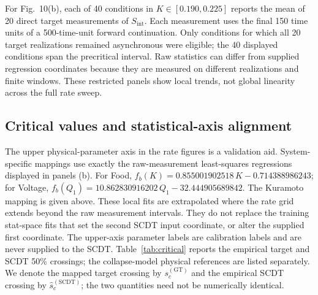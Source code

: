 \documentclass[10pt,a4paper]{article}
\begin{document}
For Fig.~10(b), each of 40 conditions in $K\in[0.190,0.225]$ reports the mean
of 20 direct target measurements of $S_{\mathrm{int}}$. Each measurement uses
the final 150 time units of a 500-time-unit forward continuation. Only
conditions for which all 20 target realizations remained asynchronous were
eligible; the 40 displayed conditions span the precritical interval. Raw
statistics can differ from supplied regression coordinates because they are
measured on different realizations and finite windows. These restricted panels
show local trends, not global linearity across the full rate sweep.

\subsection{Critical values and statistical-axis alignment}

The upper physical-parameter axis in the rate figures is a validation aid.
System-specific mappings use exactly the raw-measurement least-squares
regressions displayed in panels (b). For Food,
$f_b(K)=0.855001902518\,K-0.714388986243$; for Voltage,
$f_b(Q_1)=10.862830916202\,Q_1-32.444905689842$.
The Kuramoto mapping is given above. These local fits are extrapolated
where the rate grid extends beyond the raw measurement intervals.
They do not replace the training stat-space fits that set the second
SCDT input coordinate, or alter the supplied first coordinate.
The upper-axis parameter labels are calibration labels and are never
supplied to the SCDT. Table~\ref{tab:critical} reports the empirical
target and SCDT 50\% crossings; the collapse-model physical references
are listed separately. We denote the mapped target crossing by
$s_c^{(\mathrm{GT})}$ and the
empirical SCDT crossing by $\widehat{s}_c^{(\mathrm{SCDT})}$; the two quantities
need not be numerically identical.
\end{document}
